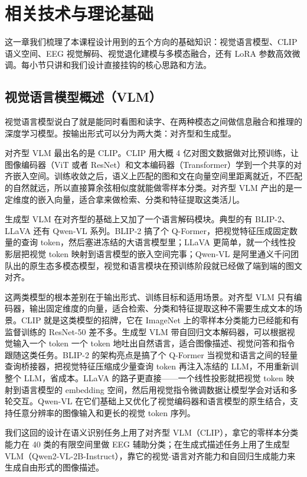 \section{相关技术与理论基础}

这一章我们梳理了本课程设计用到的五个方向的基础知识：视觉语言模型、CLIP 语义空间、EEG 视觉解码、视觉退化建模与多模态融合，还有 LoRA 参数高效微调。每小节只讲和我们设计直接挂钩的核心思路和方法。

\subsection{视觉语言模型概述（VLM）}

视觉语言模型说白了就是能同时看图和读字、在两种模态之间做信息融合和推理的深度学习模型。按输出形式可以分为两大类：对齐型和生成型。

对齐型 VLM 最出名的是 CLIP。CLIP 用大概 4 亿对图文数据做对比预训练，让图像编码器（ViT 或者 ResNet）和文本编码器（Transformer）学到一个共享的对齐嵌入空间。训练收敛之后，语义上匹配的图和文在向量空间里距离就近，不匹配的自然就远，所以直接算余弦相似度就能做零样本分类。对齐型 VLM 产出的是一定维度的嵌入向量，适合拿来做检索、分类和特征提取这类活儿。

生成型 VLM 在对齐型的基础上又加了一个语言解码模块。典型的有 BLIP-2、LLaVA 还有 Qwen-VL 系列。BLIP-2 搞了个 Q-Former，把视觉特征压成固定数量的查询 token，然后塞进冻结的大语言模型里；LLaVA 更简单，就一个线性投影层把视觉 token 映射到语言模型的嵌入空间完事；Qwen-VL 是阿里通义千问团队出的原生态多模态模型，视觉和语言模块在预训练阶段就已经做了端到端的图文对齐。

这两类模型的根本差别在于输出形式、训练目标和适用场景。对齐型 VLM 只有编码器，输出固定维度的向量，适合检索、分类和特征提取这种不需要生成文本的场景。CLIP 就是这类模型的招牌，它在 ImageNet 上的零样本分类能力已经能和有监督训练的 ResNet-50 差不多。生成型 VLM 带自回归文本解码器，可以根据视觉输入一个 token 一个 token 地吐出自然语言，适合图像描述、视觉问答和指令跟随这类任务。BLIP-2 的架构亮点是搞了个 Q-Former 当视觉和语言之间的轻量查询桥接器，把视觉特征压缩成少量查询 token 再注入冻结的 LLM，不用重新训整个 LLM，省成本。LLaVA 的路子更直接——一个线性投影就把视觉 token 映射到语言模型的 embedding 空间，然后用视觉指令微调数据让模型学会对话和多轮交互。Qwen-VL 在它们基础上又优化了视觉编码器和语言模型的原生结合，支持任意分辨率的图像输入和更长的视觉 token 序列。

我们这回的设计在语义识别任务上用了对齐型 VLM（CLIP），拿它的零样本分类能力在 40 类的有限空间里做 EEG 辅助分类；在生成式描述任务上用了生成型 VLM（Qwen2-VL-2B-Instruct），靠它的视觉-语言对齐能力和自回归生成能力来生成自由形式的图像描述。

